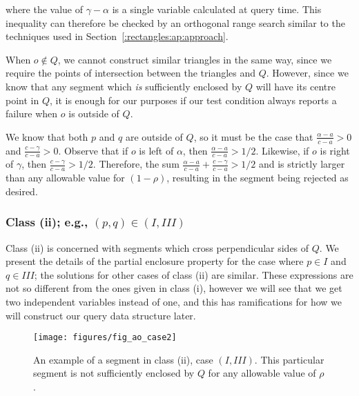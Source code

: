 \noindent where the value of $\gamma - \alpha$ is a single variable calculated at query time.  This inequality can therefore be checked by an orthogonal range search similar to the techniques used in Section~\ref{:rectangles:ap:approach}.

When $o \not \in Q$, we cannot construct similar triangles in the same way, since we require the points of intersection between the triangles and $Q$.  
However, since we know that any segment which \emph{is} sufficiently enclosed by $Q$ will have its centre point in $Q$, it is enough for our purposes if our test condition always reports a failure when $o$ is outside of $Q$.

We know that both $p$ and $q$ are outside of $Q$, so it must be the case that $\frac{\alpha - a}{c - a} > 0$ and $\frac{c - \gamma}{c - a} > 0$. Observe that if $o$ is left of $\alpha$, then $\frac{\alpha - a}{c - a} > 1/2$. Likewise, if $o$ is right of $\gamma$, then $\frac{c - \gamma}{c - a} > 1/2$. Therefore, the sum $\frac{\alpha - a}{c - a} + \frac{c - \gamma}{c - a} > 1/2$ and is strictly larger than any allowable value for $(1 - \rho)$, resulting in the segment being rejected as desired.


\subsubsection{Class (ii); e.g., $(p, q) \in (I, III)$}
\label{:rectanges:ao:class2}

Class (ii) is concerned with segments which cross perpendicular sides of $Q$. 
We present the details of the partial enclosure property for the case where $p \in I$ and $q \in III$; the solutions for other cases of class (ii) are similar. 
These expressions are not so different from the ones given in class (i), however we will see that we get two independent variables instead of one, and this has ramifications for how we will construct our query data structure later.

\begin{figure}[t]
\begin{center}
  \texttt{[image: figures/fig\_ao\_case2]}
  \caption[An example of a segment in class (ii), case $(I, III)$.]{An example of a segment in class (ii), case $(I, III)$. This particular segment is not sufficiently enclosed by $Q$ for any allowable value of $\rho$.}
  \label{fig:rectangles:ao:case2}
\end{center}
\end{figure}

